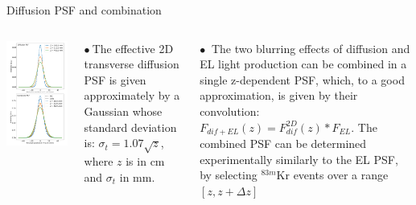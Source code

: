 \documentclass [aspectratio=169]{beamer}
\begin{document}
\begin{frame}{ Diffusion PSF and combination}

\begin{columns}
\includegraphics[scale=0.25]{combinedPSF.png}

$\bullet~$The effective 2D transverse diffusion PSF is given approximately by a Gaussian whose standard deviation is: $\sigma_t=1.07\sqrt{z}$, where $z$ is in cm and $\sigma_t$ in mm. 

$\bullet~$ The two blurring effects of diffusion and EL light production can be combined in a single z-dependent PSF, which, to a good approximation, is given by their convolution: $F_{dif+EL}(z)=F_{dif}^{2D}(z) * F_{EL}$.  The combined PSF can be determined experimentally similarly to the EL PSF, by selecting $^{83m}$Kr events over a range $[z,z+\Delta z]$
\end{columns}
\end{frame}
\end{document}
